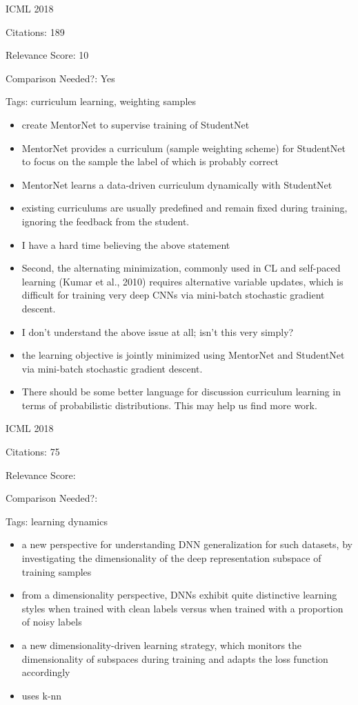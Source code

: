 \documentclass[11pt]{article}
\begin{document}
\noindent ICML 2018

\noindent Citations: 189

\noindent Relevance Score: 10

\noindent Comparison Needed?: Yes

\noindent Tags: curriculum learning, weighting samples

\begin{itemize}
\item create MentorNet to supervise training of StudentNet
\item MentorNet provides a curriculum (sample weighting scheme) for StudentNet to focus on the sample
the label of which is probably correct
\item MentorNet learns a data-driven
curriculum dynamically with StudentNet
\item existing
curriculums are usually predefined and remain fixed during
training, ignoring the feedback from the student.
\item I have a hard time believing the above statement 
\item Second, the alternating minimization, commonly used in
CL and self-paced learning (Kumar et al., 2010) requires
alternative variable updates, which is difficult for training
very deep CNNs via mini-batch stochastic gradient descent.
\item I don't understand the above issue at all; isn't this very simply?
\item the learning objective is jointly minimized
using MentorNet and StudentNet via mini-batch stochastic
gradient descent.
\item There should be some better language for discussion curriculum learning in terms of probabilistic distributions. This may help us find more work.
\end{itemize}


\vspace{2cm}

\noindent ICML 2018

\noindent Citations: 75

\noindent Relevance Score:

\noindent Comparison Needed?: 

\noindent Tags: learning dynamics

\begin{itemize}
\item a new perspective for understanding DNN generalization for such datasets, by investigating the dimensionality of the deep representation subspace of training samples
\item from a dimensionality perspective, DNNs exhibit quite distinctive learning styles when trained with clean labels versus when trained with a proportion of noisy labels
\item a new dimensionality-driven learning strategy, which monitors the dimensionality of subspaces during training and adapts the loss function accordingly
\item uses k-nn
\end{itemize}
\end{document}
